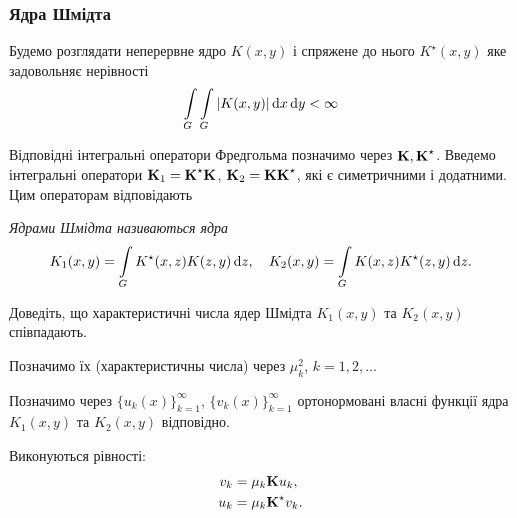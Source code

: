 \subsubsection{Ядра Шмідта}

Будемо розглядати неперервне ядро $K(x, y)$ і спряжене до нього $K^\star (x,y)$ яке задовольняє нерівності
\begin{equation}
	\Int_G\Int_G|K(x,y)|\diff x\diff y<\infty
\end{equation}

Відповідні інтегральні оператори Фредгольма позначимо через $\bf{K}, \bf{K}^\star $. Введемо інтегральні оператори $\bf{K}_1=\bf{K}^\star \bf{K}$, $\bf{K}_2=\bf{K}\bf{K}^\star $, які є симетричними і додатними. Цим операторам відповідають 

\begin{definition}
	\it{Ядрами Шмідта} називаються ядра
	\begin{equation}
		K_1(x, y) = \Int_G K^\star (x, z) K(z, y) \diff z, \quad K_2(x, y) = \Int_G K(x, z) K^\star (z, y) \diff z.
	\end{equation}
\end{definition}

\begin{problem}
    Доведіть, що характеристичні числа ядер Шмідта $K_1(x, y)$ та $K_2(x, y)$ співпадають.
\end{problem}

Позначимо їх (характеристичны числа) через $\mu_k^2$, $k=1,2,\ldots$ \medskip

Позначимо через $\{u_k(x)\}_{k=1}^\infty$, $\{v_k(x)\}_{k=1}^\infty$ ортонормовані власні функції ядра $K_1(x,y)$ та $K_2(x,y)$ відповідно. \medskip

\begin{proposition}
	\label{proposition:2.6.3}
	Виконуються рівності:
	\begin{align}
		v_k&=\mu_k\bf{K}u_k, \\
		u_k&=\mu_k\bf{K}^\star v_k.
	\end{align}
\end{proposition}


